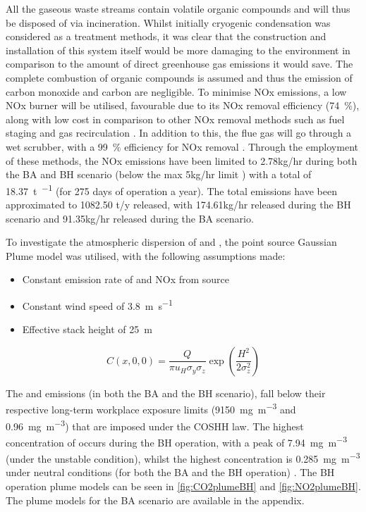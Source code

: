 All the gaseous waste 
streams contain volatile organic compounds and will thus be disposed of via incineration. Whilst initially cryogenic condensation was considered as a treatment methods, it was clear that the construction and installation of this system itself would be more damaging to the environment in comparison to the amount of direct greenhouse gas emissions it would save. The complete combustion of organic compounds is assumed and thus the emission of carbon monoxide and carbon are negligible. To minimise NOx emissions, a low NOx burner will be utilised, favourable due to its NOx removal efficiency (\SI{74}{\percent}), along with low cost in comparison to other NOx removal methods such as fuel staging and gas recirculation \cite{world_bank_group_pollution_1999}. In addition to this, the flue gas will go through a wet scrubber, with a \SI{99}{\percent} efficiency for NOx removal \cite{ceco_environmental_nox_nodate}. Through the employment of these methods, the NOx emissions have been limited to 2.78kg/hr during both the BA and BH scenario (below the max 5kg/hr limit ) with a total of \SI{18.37}{\tonne\per\year} (for 275 days of operation a year). The total  emissions have been approximated to 1082.50 t/y released, with 174.61kg/hr released during the BH scenario and 91.35kg/hr released during the BA scenario. 

To investigate the atmospheric dispersion of  and , the point source Gaussian Plume model was utilised, with the following assumptions made:

\begin{itemize}
\item Constant emission rate of  and NOx from source
\item Constant wind speed of \SI{3.8}{\m\per\s} \cite{weather_spark_average_nodate}
\item Effective stack height of \SI{25}{\m} 
\end{itemize}

\begin{equation}
C(x,0,0)= \frac{Q}{\pi u_{H} \sigma_{y} \sigma_{z}} \exp\left( \frac{H^2}{2\sigma_{z}^2}\right)
\end{equation}


The  and  emissions (in both the BA and the BH scenario), fall below their respective long-term workplace exposure limits (\SI{9150}{\mg\per\cubic\m} and \SI{0.96}{\mg\per\cubic\m}) that are imposed under the COSHH law. The highest concentration of  occurs during the BH operation, with a peak of \SI{7.94}{\mg\per\cubic\m}  (under the unstable condition), whilst the highest  concentration is \SI{0.285}{\mg\per\cubic\m} under neutral conditions (for both the BA and the BH operation) \cite{great_britain_health_and_safety_executive_workplace_2020}. The BH operation plume models can be seen in \ref{fig:CO2plumeBH} and \ref{fig:NO2plumeBH}. The plume models for the BA scenario are available in the appendix. 

